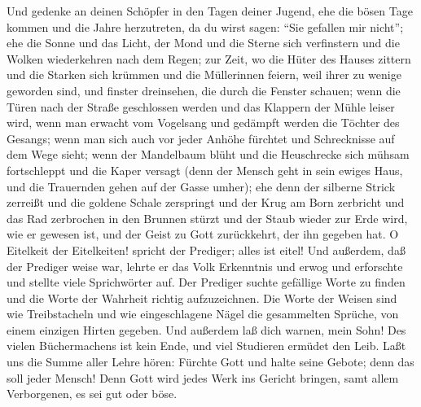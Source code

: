  Und gedenke an deinen Schöpfer in den Tagen deiner
Jugend, ehe die bösen Tage kommen und die Jahre herzutreten, da du wirst
sagen: ``Sie gefallen mir nicht'';  ehe die Sonne und das
Licht, der Mond und die Sterne sich verfinstern und die Wolken
wiederkehren nach dem Regen;  zur Zeit, wo die Hüter des
Hauses zittern und die Starken sich krümmen und die Müllerinnen feiern,
weil ihrer zu wenige geworden sind, und finster dreinsehen, die durch
die Fenster schauen;  wenn die Türen nach der Straße
geschlossen werden und das Klappern der Mühle leiser wird, wenn man
erwacht vom Vogelsang und gedämpft werden die Töchter des Gesangs;
 wenn man sich auch vor jeder Anhöhe fürchtet und
Schrecknisse auf dem Wege sieht; wenn der Mandelbaum blüht und die
Heuschrecke sich mühsam fortschleppt und die Kaper versagt (denn der
Mensch geht in sein ewiges Haus, und die Trauernden gehen auf der Gasse
umher);  ehe denn der silberne Strick zerreißt und die
goldene Schale zerspringt und der Krug am Born zerbricht und das Rad
zerbrochen in den Brunnen stürzt  und der Staub wieder zur
Erde wird, wie er gewesen ist, und der Geist zu Gott zurückkehrt, der
ihn gegeben hat.  O Eitelkeit der Eitelkeiten! spricht der
Prediger; alles ist eitel!  Und außerdem, daß der Prediger
weise war, lehrte er das Volk Erkenntnis und erwog und erforschte und
stellte viele Sprichwörter auf.  Der Prediger suchte
gefällige Worte zu finden und die Worte der Wahrheit richtig
aufzuzeichnen.  Die Worte der Weisen sind wie
Treibstacheln und wie eingeschlagene Nägel die gesammelten Sprüche, von
einem einzigen Hirten gegeben.  Und außerdem laß dich
warnen, mein Sohn! Des vielen Büchermachens ist kein Ende, und viel
Studieren ermüdet den Leib.  Laßt uns die Summe aller
Lehre hören: Fürchte Gott und halte seine Gebote; denn das soll jeder
Mensch!  Denn Gott wird jedes Werk ins Gericht bringen,
samt allem Verborgenen, es sei gut oder böse.
